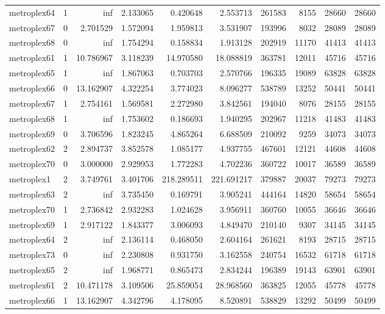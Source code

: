 \begin{longtable}{|l|r|r|r|r|r|r|r|r|r|}
metroplex64 & 1 & inf & 2.133065 & 0.420648 & 2.553713 & 261583 & 8155 & 28660 & 28660 \\
metroplex67 & 0 & 2.701529 & 1.572094 & 1.959813 & 3.531907 & 193996 & 8032 & 28089 & 28089 \\
metroplex68 & 0 & inf & 1.754294 & 0.158834 & 1.913128 & 202919 & 11170 & 41413 & 41413 \\
metroplex61 & 1 & 10.786967 & 3.118239 & 14.970580 & 18.088819 & 363781 & 12011 & 45716 & 45716 \\
metroplex65 & 1 & inf & 1.867063 & 0.703703 & 2.570766 & 196335 & 19089 & 63828 & 63828 \\
metroplex66 & 0 & 13.162907 & 4.322254 & 3.774023 & 8.096277 & 538789 & 13252 & 50441 & 50441 \\
metroplex67 & 1 & 2.754161 & 1.569581 & 2.272980 & 3.842561 & 194040 & 8076 & 28155 & 28155 \\
metroplex68 & 1 & inf & 1.753602 & 0.186693 & 1.940295 & 202967 & 11218 & 41483 & 41483 \\
metroplex69 & 0 & 3.706596 & 1.823245 & 4.865264 & 6.688509 & 210092 & 9259 & 34073 & 34073 \\
metroplex62 & 2 & 2.894737 & 3.852578 & 1.085177 & 4.937755 & 467601 & 12121 & 44608 & 44608 \\
metroplex70 & 0 & 3.000000 & 2.929953 & 1.772283 & 4.702236 & 360722 & 10017 & 36589 & 36589 \\
metroplex1 & 2 & 3.749761 & 3.401706 & 218.289511 & 221.691217 & 379887 & 20037 & 79273 & 79273 \\
metroplex63 & 2 & inf & 3.735450 & 0.169791 & 3.905241 & 444164 & 14820 & 58654 & 58654 \\
metroplex70 & 1 & 2.736842 & 2.932283 & 1.024628 & 3.956911 & 360760 & 10055 & 36646 & 36646 \\
metroplex69 & 1 & 2.917122 & 1.843377 & 3.006093 & 4.849470 & 210140 & 9307 & 34145 & 34145 \\
metroplex64 & 2 & inf & 2.136114 & 0.468050 & 2.604164 & 261621 & 8193 & 28715 & 28715 \\
metroplex73 & 0 & inf & 2.230808 & 0.931750 & 3.162558 & 240754 & 16532 & 61718 & 61718 \\
metroplex65 & 2 & inf & 1.968771 & 0.865473 & 2.834244 & 196389 & 19143 & 63901 & 63901 \\
metroplex61 & 2 & 10.471178 & 3.109506 & 25.859054 & 28.968560 & 363825 & 12055 & 45778 & 45778 \\
metroplex66 & 1 & 13.162907 & 4.342796 & 4.178095 & 8.520891 & 538829 & 13292 & 50499 & 50499 \\

\end{longtable}
